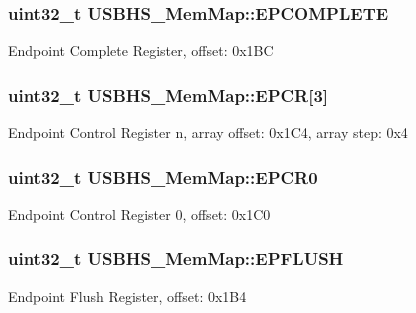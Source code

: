 \subsubsection[{E\+P\+C\+O\+M\+P\+L\+E\+T\+E}]{\setlength{\rightskip}{0pt plus 5cm}uint32\+\_\+t U\+S\+B\+H\+S\+\_\+\+Mem\+Map\+::\+E\+P\+C\+O\+M\+P\+L\+E\+T\+E}\label{struct_u_s_b_h_s___mem_map_a6e662d447a64545a849155847fd1850d}
Endpoint Complete Register, offset\+: 0x1\+B\+C \hypertarget{struct_u_s_b_h_s___mem_map_a529476b6d37196816091e756fb78dc7f}{}
\subsubsection[{E\+P\+C\+R}]{\setlength{\rightskip}{0pt plus 5cm}uint32\+\_\+t U\+S\+B\+H\+S\+\_\+\+Mem\+Map\+::\+E\+P\+C\+R\mbox{[}3\mbox{]}}\label{struct_u_s_b_h_s___mem_map_a529476b6d37196816091e756fb78dc7f}
Endpoint Control Register n, array offset\+: 0x1\+C4, array step\+: 0x4 \hypertarget{struct_u_s_b_h_s___mem_map_a869ec293a891b396768ce4ddab734381}{}
\subsubsection[{E\+P\+C\+R0}]{\setlength{\rightskip}{0pt plus 5cm}uint32\+\_\+t U\+S\+B\+H\+S\+\_\+\+Mem\+Map\+::\+E\+P\+C\+R0}\label{struct_u_s_b_h_s___mem_map_a869ec293a891b396768ce4ddab734381}
Endpoint Control Register 0, offset\+: 0x1\+C0 \hypertarget{struct_u_s_b_h_s___mem_map_a3798ba6cc78e9af879cb2364d3a5b7e3}{}
\subsubsection[{E\+P\+F\+L\+U\+S\+H}]{\setlength{\rightskip}{0pt plus 5cm}uint32\+\_\+t U\+S\+B\+H\+S\+\_\+\+Mem\+Map\+::\+E\+P\+F\+L\+U\+S\+H}\label{struct_u_s_b_h_s___mem_map_a3798ba6cc78e9af879cb2364d3a5b7e3}
Endpoint Flush Register, offset\+: 0x1\+B4 \hypertarget{struct_u_s_b_h_s___mem_map_a6dcba06cfa08c72f47f505147544a785}{}
